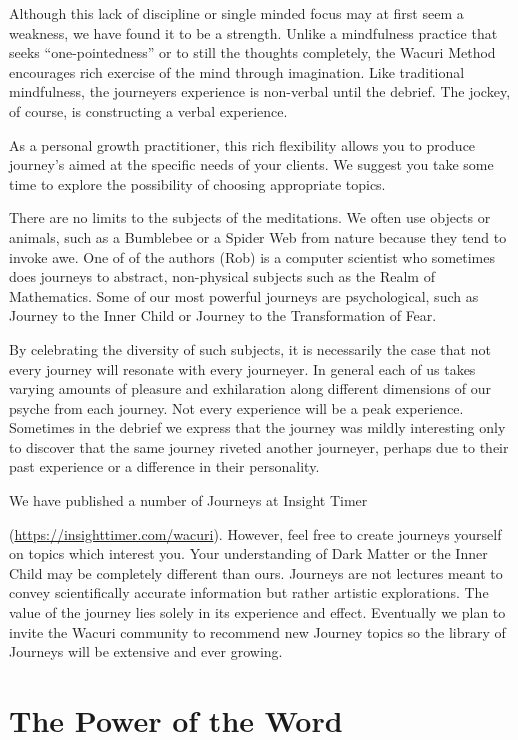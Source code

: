 \documentclass[12pt]{book}
\begin{document}
Although this lack of discipline or single minded focus may at first
seem a weakness, we have found it to be a strength. Unlike a
mindfulness practice that seeks ``one-pointedness'' or to still the
thoughts completely, the Wacuri Method encourages rich exercise of the
mind through imagination.  Like traditional mindfulness, the
journeyers experience is non-verbal until the debrief.  The jockey, of
course, is constructing a verbal experience.

As a personal growth practitioner, this rich flexibility allows you to
produce journey's aimed at the specific needs of your clients. We
suggest you take some time to explore the possibility of choosing
appropriate topics.

There are no limits to the subjects of the meditations. We often use
objects or animals, such as a Bumblebee or a Spider Web from nature
because they tend to invoke awe. One of of the authors (Rob) is a
computer scientist who sometimes does journeys to abstract,
non-physical subjects such as the Realm of Mathematics. Some of our
most powerful journeys are psychological, such as Journey to the Inner
Child or Journey to the Transformation of Fear.
					
By celebrating the diversity of such subjects, it is necessarily the
case that not every journey will resonate with every journeyer. In
general each of us takes varying amounts of pleasure and exhilaration
along different dimensions of our psyche from each journey. Not every
experience will be a peak experience. Sometimes in the debrief we
express that the journey was mildly interesting only to discover that
the same journey riveted another journeyer, perhaps due to their past
experience or a difference in their personality.

We have published a number of Journeys at Insight Timer

(\url{https://insighttimer.com/wacuri}).  However, feel free to create
journeys yourself on topics which interest you. Your understanding of
Dark Matter or the Inner Child may be completely different than
ours. Journeys are not lectures meant to convey scientifically
accurate information but rather artistic explorations.
The value of the journey lies solely in its experience and
effect.  Eventually we plan to invite the Wacuri community to
recommend new Journey topics so the library of Journeys will be extensive and ever growing.


\chapter{The Power of the Word}
\end{document}
